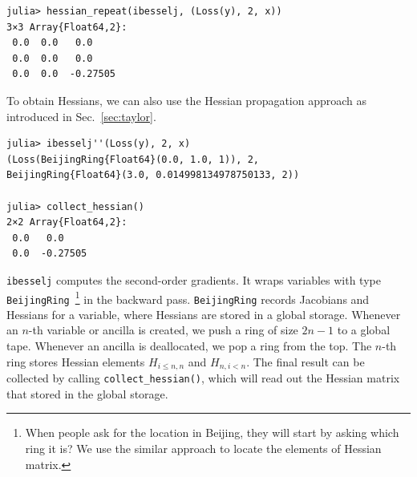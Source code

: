 \documentclass[aps,twocolumn,longbibliography,english,superscriptaddress]{revtex4-1}
\newcommand{\<}{\langle}
\renewcommand{\>}{\rangle}
\newcommand{\Fig}[1]{Fig.~\ref{#1}}
\newcommand{\Sec}[1]{Sec.~\ref{#1}}
\theoremstyle{definition}\newtheorem{definition}{\textit{Definition}}
\begin{document}
\begin{minipage}{.44\textwidth}
\begin{lstlisting}
julia> hessian_repeat(ibesselj, (Loss(y), 2, x))
3×3 Array{Float64,2}:
 0.0  0.0   0.0    
 0.0  0.0   0.0    
 0.0  0.0  -0.27505
\end{lstlisting}
\end{minipage}


To obtain Hessians, we can also use the Hessian propagation approach as introduced in \Sec{sec:taylor}.

\begin{minipage}{.44\textwidth}
\begin{lstlisting}
julia> ibesselj''(Loss(y), 2, x)
(Loss(BeijingRing{Float64}(0.0, 1.0, 1)), 2, 
BeijingRing{Float64}(3.0, 0.014998134978750133, 2))

julia> collect_hessian()
2×2 Array{Float64,2}:
 0.0   0.0    
 0.0  -0.27505
\end{lstlisting}
\end{minipage}

\texttt{ibesselj\textquotesingle\textquotesingle} computes the second-order gradients. It wraps variables with type \texttt{BeijingRing}~\footnote{When people ask for the location in Beijing, they will start by asking which ring it is? We use the similar approach to locate the elements of Hessian matrix.} in the backward pass. \texttt{BeijingRing} records Jacobians and Hessians for a variable, where Hessians are stored in a global storage.
Whenever an $n$-th variable or ancilla is created, we push a ring of size $2n-1$ to a global tape. Whenever an ancilla is deallocated, we pop a ring from the top. The $n$-th ring stores Hessian elements $H_{i\leq n,n}$ and $H_{n,i<n}$.%
The final result can be collected by calling \texttt{collect\_hessian()}, which will read out the Hessian matrix that stored in the global storage.
\end{document}
